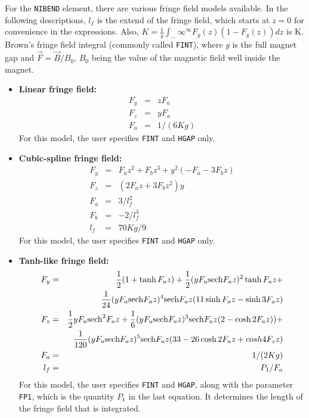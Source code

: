 For the {\tt NIBEND} element, there are various fringe field models available.
In the following descriptions, $l_f$ is the extend of the fringe field, which
starts at $z=0$ for convenience in the expressions.  Also,
$K = \frac{1}{g}\int_-\infty^\infty F_y(z) (1-F_y(z)) dz$ is K. Brown's fringe
field integral (commonly called {\tt FINT}), where $g$ is the full magnet gap
and $\vec{F} = \vec{B}/B_0$, $B_0$ being the value of the magnetic field well inside
the magnet.

\begin{itemize}
\item {\bf Linear fringe field:} 
\begin{eqnarray}
        F_y & = & z F_a \\
        F_z & = & y F_a \\
        F_a & = & 1/(6 K g) 
\end{eqnarray}
For this model, the user specifies {\tt FINT} and {\tt HGAP} only.

\item {\bf Cubic-spline fringe field:}
\begin{eqnarray}
        F_y & = & F_a z^2 + F_b z^3 + y^2 (-F_a - 3 F_b z) \\
        F_z & = & (2 F_a z + 3 F_b z^2) y \\
        F_a & = & 3/l_f^2 \\
        F_b & = & -2/l_f^3 \\
        l_f & = & 70 K g/9 
\end{eqnarray}
For this model, the user specifies {\tt FINT} and {\tt HGAP} only.

\item  {\bf Tanh-like fringe field:}
\begin{eqnarray}
F_y & = & \frac{1}{2} (1 + \tanh F_a z) +
          \frac{1}{2} (y F_a {\rm sech} F_a z )^2 \tanh F_a z + \\
    &   & \frac{1}{24} (y F_a {\rm sech} F_a z)^4 {\rm sech} F_a z (11 \sinh F_a z - \sinh 3 F_a z) \\
F_z & = & \frac{1}{2} y F_a {\rm sech}^2 F_a z + 
          \frac{1}{6} (y F_a {\rm sech} F_a z)^3 {\rm sech} F_a z (2 - \cosh 2 F_a z)) + \\
    &   & \frac{1}{120} (y F_a {\rm sech} F_a z)^5 {\rm sech} F_a z (33 - 26 \cosh 2 F_a z + cosh  4 F_z z) \\
F_a & = & 1/(2 K g) \\
l_f & = & P_1/F_a
\end{eqnarray}
For this model, the user specifies {\tt FINT} and {\tt HGAP}, along with the parameter {\tt FP1}, which
is the quantity $P_1$ in the last equation.  It determines the length of the fringe field that is integrated.


\end{itemize}
